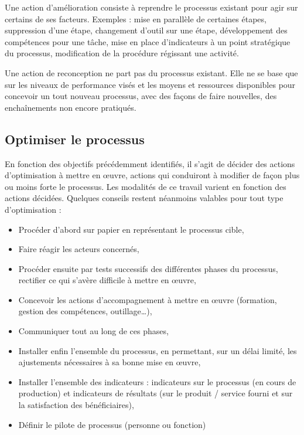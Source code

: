 Une action d'amélioration consiste à reprendre le processus existant pour agir sur certains de ses facteurs. Exemples : mise en parallèle de certaines étapes, suppression d'une étape, changement d'outil sur une étape, développement des compétences pour une tâche, mise en place d'indicateurs à un point stratégique du processus, modification de la procédure régissant une activité.

Une action de reconception ne part pas du processus existant. Elle ne se base que sur les niveaux de performance visés et les moyens et ressources disponibles pour concevoir un tout nouveau processus, avec des façons de faire nouvelles, des enchaînements non encore pratiqués.

\subsection{Optimiser le processus}

En fonction des objectifs précédemment identifiés, il s'agit de décider des actions d'optimisation à mettre en œuvre, actions qui conduiront à modifier de façon plus ou moins forte le processus. Les modalités de ce travail varient en fonction des actions décidées. Quelques conseils restent néanmoins valables pour tout type d'optimisation : 

\begin{itemize}[label=\textbullet, font=\LARGE \color{blue}]
	\item Procéder d'abord sur papier en représentant le processus cible, 
	\item Faire réagir les acteurs concernés, 
	\item Procéder ensuite par tests successifs des différentes phases du processus, rectifier ce qui s'avère difficile à mettre en œuvre, 
	\item Concevoir les actions d'accompagnement à mettre en œuvre (formation, gestion des compétences, outillage…), 
	\item Communiquer tout au long de ces phases, 
	\item Installer enfin l'ensemble du processus, en permettant, sur un délai limité, les ajustements nécessaires à sa bonne mise en œuvre, 
	\item Installer l'ensemble des indicateurs : indicateurs sur le processus (en cours de production) et indicateurs de résultats (sur le produit / service fourni et sur la satisfaction des bénéficiaires), 
	\item Définir le pilote de processus (personne ou fonction)
\end{itemize}


